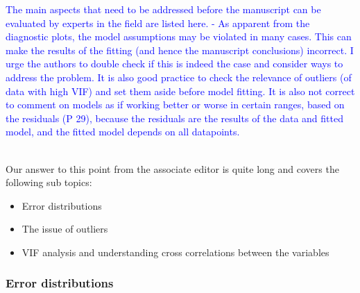 \documentclass[]{elsarticle} %
\providecommand{\tightlist}{%
  \setlength{\itemsep}{0pt}\setlength{\parskip}{0pt}}
\begin{document}
\textcolor{blue}{The main aspects that need to be addressed before the manuscript can be evaluated by experts in the field are listed here. 
- As apparent from the diagnostic plots, the model assumptions may be violated in many cases. This can make the results of the fitting (and hence the manuscript conclusions) incorrect. I urge the authors to double check if this is indeed the case and consider ways to address the problem. It is also good practice to check the relevance of outliers (of data with high VIF) and set them aside before model fitting. It is also not correct to comment on models as if working better or worse in certain ranges, based on the residuals (P 29), because the residuals are the results of the data and fitted model, and the fitted model depends on all datapoints.}\\
\strut \\
Our answer to this point from the associate editor is quite long and covers the following sub topics:

\begin{itemize}
\tightlist
\item
  Error distributions\\
\item
  The issue of outliers\\
\item
  VIF analysis and understanding cross correlations between the variables
\end{itemize}

\hypertarget{error-distributions}{%
\subsubsection{Error distributions}\label{error-distributions}}
\end{document}
